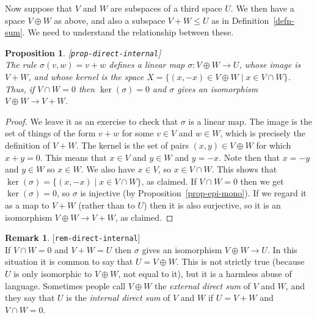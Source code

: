\documentclass{amsart}
\newcommand{\lbl}[1]{\label{#1}\textup{[\texttt{#1}]}\ \\}
\newcommand{\lbl}{\label}
\newcommand{\sg}        {\sigma}
\newcommand{\st}        {\;|\;}
\newcommand{\op}        {\oplus}
\renewcommand{\:}       {\colon}
\newtheorem{proposition}[theorem]{Proposition}
\theoremstyle{definition}
\newtheorem{remark}[theorem]{Remark}
\begin{document}
Now suppose that $V$ and $W$ are subspaces of a third space
$U$.  We then have a space $V\op W$ as above, and also a
subspace $V+W\leq U$ as in Definition~\ref{defn-sum}.  We
need to understand the relationship between these.
\begin{proposition}\lbl{prop-direct-internal}
 The rule $\sg(v,w)=v+w$ defines a linear map
 $\sg\:V\op W\to U$, whose image is $V+W$, and whose kernel
 is the space $X=\{(x,-x)\in V\op W\st x\in V\cap W\}$.
 Thus, if $V\cap W=0$ then $\ker(\sg)=0$ and $\sg$ gives an
 isomorphism $V\op W\to V+W$.
\end{proposition}
\begin{proof}
 We leave it as an exercise to check that $\sg$ is a linear
 map.  The image is the set of things of the form $v+w$ for
 some $v\in V$ and $w\in W$, which is precisely the
 definition of $V+W$.  The kernel is the set of pairs
 $(x,y)\in V\op W$ for which $x+y=0$.  This means that
 $x\in V$ and $y\in W$ and $y=-x$.  Note then that $x=-y$
 and $y\in W$ so $x\in W$.  We also have $x\in V$, so
 $x\in V\cap W$.  This shows that
 $\ker(\sg)=\{(x,-x)\st x\in V\cap W\}$, as claimed.  If
 $V\cap W=0$ then we get $\ker(\sg)=0$, so $\sg$ is
 injective (by Proposition~\ref{prop-epi-mono}).  If we
 regard it as a map to $V+W$ (rather than to $U$) then it is
 also surjective, so it is an isomorphism $V\op W\to V+W$,
 as claimed.
\end{proof}
\begin{remark}\lbl{rem-direct-internal}
 If $V\cap W=0$ and $V+W=U$ then $\sg$ gives an isomorphism
 $V\op W\to U$.  In this situation it is common to say that
 $U=V\op W$.  This is not strictly true (because $U$ is only
 isomorphic to $V\op W$, not equal to it), but it is a
 harmless abuse of language.  Sometimes people call $V\op W$
 the \emph{external direct sum} of $V$ and $W$, and they say
 that $U$ is the \emph{internal direct sum} of $V$ and $W$
 if $U=V+W$ and $V\cap W=0$.
\end{remark}
\end{document}
